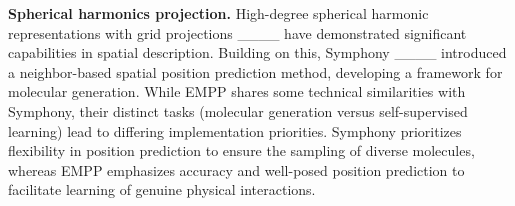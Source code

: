 \textbf{Spherical harmonics projection.} High-degree spherical harmonic representations with grid projections ____ have demonstrated significant capabilities in spatial description. Building on this, Symphony ____ introduced a neighbor-based spatial position prediction method, developing a framework for molecular generation. While EMPP shares some technical similarities with Symphony, their distinct tasks (molecular generation versus self-supervised learning) lead to differing implementation priorities. Symphony prioritizes flexibility in position prediction to ensure the sampling of diverse molecules, whereas EMPP emphasizes accuracy and well-posed position prediction to facilitate learning of genuine physical interactions.



\vspace{-1em}